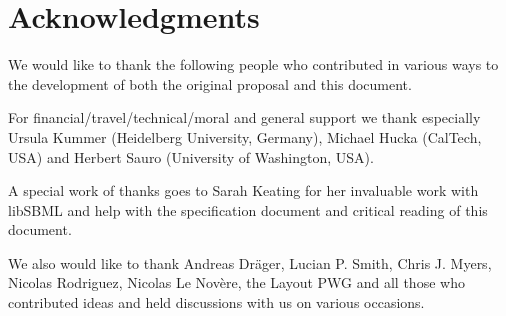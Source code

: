 
\section{Acknowledgments}

We would like to thank the following people who contributed in various ways to the development of both the original proposal and this document.

For financial/travel/technical/moral and general support we thank especially Ursula Kummer (Heidelberg University, Germany), Michael Hucka (CalTech, USA) and Herbert Sauro (University of Washington, USA).

A special work of thanks goes to Sarah Keating for her invaluable work with  \textsf{libSBML} and help with the specification document and critical reading of this document.

We also would like to thank Andreas Dr\"{a}ger, Lucian P. Smith, Chris J. Myers, Nicolas Rodriguez,  Nicolas Le Nov\`{e}re, the Layout PWG and all those who contributed ideas and held discussions with us on various occasions.


